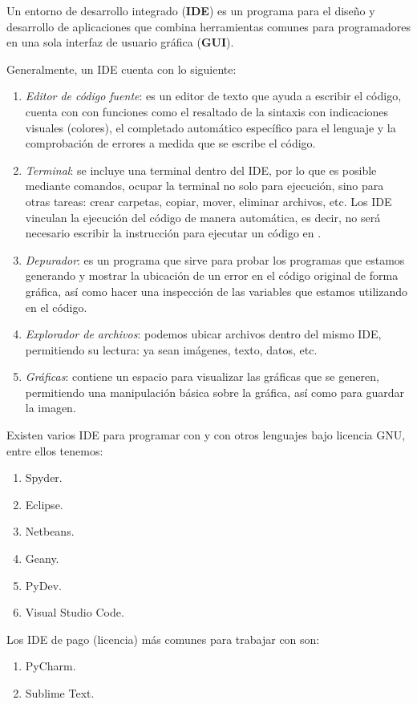 Un entorno de desarrollo integrado (\textbf{IDE}) es un programa para el diseño y desarrollo de aplicaciones que combina herramientas comunes para programadores en una sola interfaz de usuario gráfica (\textbf{GUI}).
\par
Generalmente, un IDE cuenta con lo siguiente:
\begin{enumerate}[label=\alph*)]
\item \textit{Editor de código fuente}: es un editor de texto que ayuda a escribir el código, cuenta con  con funciones como el resaltado de la sintaxis con indicaciones visuales (colores), el completado automático específico para el lenguaje y la comprobación de errores a medida que se escribe el código.
\item \textit{Terminal}: se incluye una terminal dentro del IDE, por lo que es posible mediante comandos, ocupar la terminal no solo para ejecución, sino para otras tareas: crear carpetas, copiar, mover, eliminar archivos, etc. Los IDE vinculan la ejecución del código de manera automática, es decir, no será necesario escribir la instrucción para ejecutar un código en \python.
\item \textit{Depurador}: es un programa que sirve para probar los programas que estamos generando y mostrar la ubicación de un error en el código original de forma gráfica, así como hacer una inspección de las variables que estamos utilizando en el código.
\item \textit{Explorador de archivos}: podemos ubicar archivos dentro del mismo IDE, permitiendo su lectura: ya sean imágenes, texto, datos, etc.
\item \textit{Gráficas}: contiene un espacio para visualizar las gráficas que se generen, permitiendo una manipulación básica sobre la gráfica, así como para guardar la imagen.
\end{enumerate}

Existen varios IDE para programar con \python y con otros lenguajes bajo licencia GNU, entre ellos tenemos:
\begin{enumerate}[label=\roman*)]
\item Spyder.
\item Eclipse.
\item Netbeans.
\item Geany.
\item PyDev.
\item Visual Studio Code.
\end{enumerate}

Los IDE de pago (licencia) más comunes para trabajar con \python{} son:
\begin{enumerate}[label=\alph*)]
\item PyCharm.
\item Sublime Text.
\end{enumerate}

